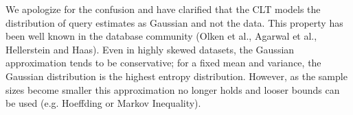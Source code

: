 We apologize for the confusion and have clarified that the CLT models the distribution of query estimates as Gaussian and not the data. This property has been well known in the database community (Olken et al., Agarwal et al., Hellerstein and Haas). Even in highly skewed datasets, the Gaussian approximation tends to be conservative; for a fixed mean and variance, the Gaussian distribution is the highest entropy distribution. However, as the sample sizes become smaller this approximation no longer holds and looser bounds can be used (e.g. Hoeffding or Markov Inequality). 






























































































 


